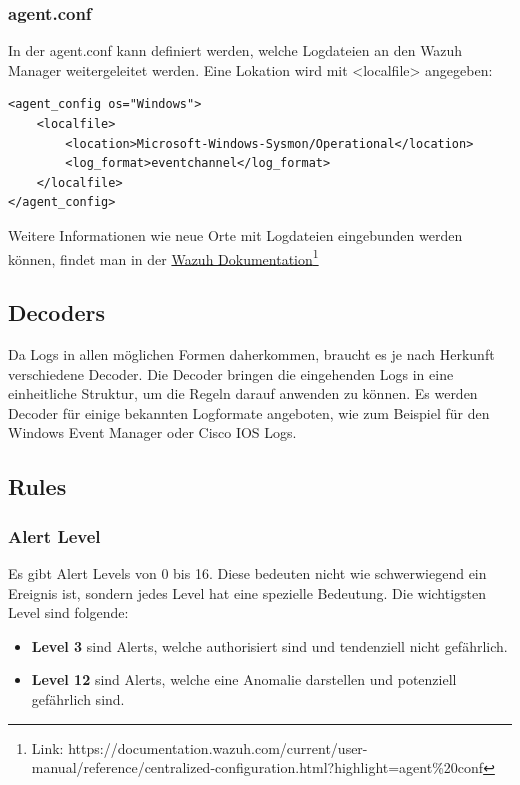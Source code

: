 \subsubsection{agent.conf}
In der agent.conf kann definiert werden, welche Logdateien an den Wazuh Manager weitergeleitet werden. 
Eine Lokation wird mit <localfile> angegeben:
\begin{lstlisting}
<agent_config os="Windows">
    <localfile>
        <location>Microsoft-Windows-Sysmon/Operational</location>
        <log_format>eventchannel</log_format>
    </localfile>
</agent_config>
\end{lstlisting}
Weitere Informationen wie neue Orte mit Logdateien eingebunden werden können, findet man in der \href{https://documentation.wazuh.com/current/user-manual/reference/centralized-configuration.html?highlight=agent%20conf}{Wazuh Dokumentation}\footnote{Link: https://documentation.wazuh.com/current/user-manual/reference/centralized-configuration.html?highlight=agent\%20conf}

\subsection{Decoders}
Da Logs in allen möglichen Formen daherkommen, braucht es je nach Herkunft verschiedene Decoder.
Die Decoder bringen die eingehenden Logs in eine einheitliche Struktur, um die Regeln darauf anwenden zu können.
Es werden Decoder für einige bekannten Logformate angeboten, wie zum Beispiel für den Windows Event Manager oder Cisco IOS Logs.

\subsection{Rules}

\subsubsection{Alert Level}
Es gibt Alert Levels von 0 bis 16. 
Diese bedeuten nicht wie schwerwiegend ein Ereignis ist, sondern jedes Level hat eine spezielle Bedeutung.
Die wichtigsten Level sind folgende:
\begin{itemize}
    \item \textbf{Level 3} sind Alerts, welche authorisiert sind und tendenziell nicht gefährlich.
    \item \textbf{Level 12} sind Alerts, welche eine Anomalie darstellen und potenziell gefährlich sind.
\end{itemize}


